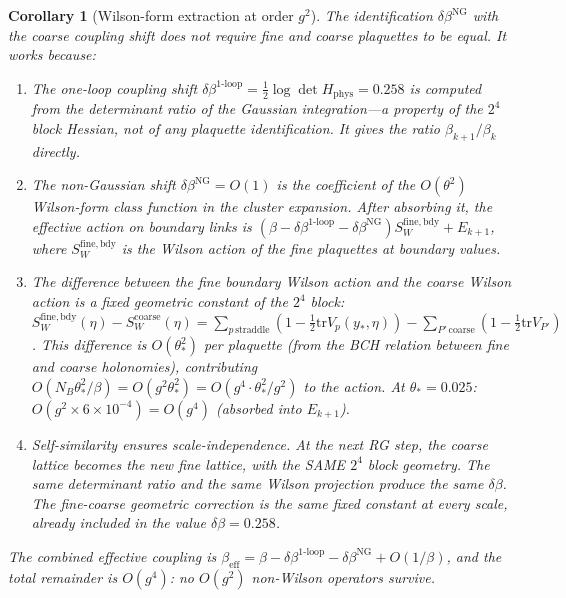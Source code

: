\documentclass[11pt]{article}
\newtheorem{corollary}[theorem]{Corollary}
\theoremstyle{definition}
\newcommand{\tr}{\mathrm{tr}}
\begin{document}
\begin{corollary}[Wilson-form extraction at order $g^2$]
The identification $\delta\beta^{\mathrm{NG}}$ with the
\emph{coarse} coupling shift does not require fine and coarse
plaquettes to be equal.  It works because:
\begin{enumerate}[nosep,label=(\alph*)]
\item The one-loop coupling shift
$\delta\beta^{1\text{-loop}}=\frac{1}{2}\log\det H_{\mathrm{phys}}
=0.258$ is computed from the determinant ratio of the Gaussian
integration---a property of the $2^4$ block Hessian, not of any
plaquette identification.  It gives the ratio $\beta_{k+1}/\beta_k$
directly.
\item The non-Gaussian shift $\delta\beta^{\mathrm{NG}}=O(1)$ is
the coefficient of the $O(\theta^2)$ Wilson-form class function
in the cluster expansion.  After absorbing it, the effective action
on boundary links is $(\beta-\delta\beta^{1\text{-loop}}
-\delta\beta^{\mathrm{NG}})S_W^{\mathrm{fine,bdy}}
+E_{k+1}$, where $S_W^{\mathrm{fine,bdy}}$ is the Wilson action
of the fine plaquettes at boundary values.
\item The difference between the fine boundary Wilson action and
the coarse Wilson action is a fixed geometric constant of the
$2^4$ block:
$S_W^{\mathrm{fine,bdy}}(\eta)
-S_W^{\mathrm{coarse}}(\eta)
=\sum_{p\,\mathrm{straddle}}(1-\frac{1}{2}\tr V_p(y_*,\eta))
-\sum_{P'\,\mathrm{coarse}}(1-\frac{1}{2}\tr V_{P'})$.
This difference is $O(\theta_*^2)$ per plaquette
(from the BCH relation between fine and coarse holonomies),
contributing $O(N_B\theta_*^2/\beta)=O(g^2\theta_*^2)
=O(g^4\cdot\theta_*^2/g^2)$ to the action.
At $\theta_*=0.025$: $O(g^2\times 6\times 10^{-4})
=O(g^4)$ (absorbed into $E_{k+1}$).
\item \emph{Self-similarity ensures scale-independence.}
At the next RG step, the coarse lattice becomes the new fine
lattice, with the SAME $2^4$ block geometry.  The same
determinant ratio and the same Wilson projection produce the
same $\delta\beta$.  The fine-coarse geometric correction is
the same fixed constant at every scale, already included in
the value $\delta\beta=0.258$.
\end{enumerate}
The combined effective coupling is
$\beta_{\mathrm{eff}}=\beta-\delta\beta^{1\text{-loop}}
-\delta\beta^{\mathrm{NG}}+O(1/\beta)$,
and the total remainder is $O(g^4)$: no $O(g^2)$
non-Wilson operators survive.
\end{corollary}
\end{document}
